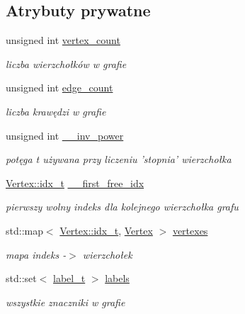 \subsection*{Atrybuty prywatne}
\begin{DoxyCompactItemize}
\item 
unsigned int \hyperlink{classGraph_aa0961f75ec603fa6b4f1e631b70233f1}{vertex\-\_\-count}
\begin{DoxyCompactList}\small\item\em liczba wierzchołków w grafie \end{DoxyCompactList}\item 
unsigned int \hyperlink{classGraph_ad84b4512d3366d236491358b6314bc47}{edge\-\_\-count}
\begin{DoxyCompactList}\small\item\em liczba krawędzi w grafie \end{DoxyCompactList}\item 
unsigned int \hyperlink{classGraph_a53211b7cd85e28093bbe540e5a2ec21d}{\-\_\-\-\_\-inv\-\_\-power}
\begin{DoxyCompactList}\small\item\em potęga t używana przy liczeniu 'stopnia' wierzchołka \end{DoxyCompactList}\item 
\hyperlink{classVertex_a12fe2194264f72b70b284bba723052c1}{Vertex\-::idx\-\_\-t} \hyperlink{classGraph_a205f5526664ea4f94ad94c1cb7de3c56}{\-\_\-\-\_\-first\-\_\-free\-\_\-idx}
\begin{DoxyCompactList}\small\item\em pierwszy wolny indeks dla kolejnego wierzchołka grafu \end{DoxyCompactList}\item 
std\-::map$<$ \hyperlink{classVertex_a12fe2194264f72b70b284bba723052c1}{Vertex\-::idx\-\_\-t}, \hyperlink{classVertex}{Vertex} $>$ \hyperlink{classGraph_a69d5f1746e168b9555daa83b84c0341b}{vertexes}
\begin{DoxyCompactList}\small\item\em mapa indeks -\/$>$ wierzchołek \end{DoxyCompactList}\item 
std\-::set$<$ \hyperlink{classGraph_a2237a0ada8484c37b8200c0e3685ca71}{label\-\_\-t} $>$ \hyperlink{classGraph_a752008a468385625c22da499d248ada3}{labels}
\begin{DoxyCompactList}\small\item\em wszystkie znaczniki w grafie \end{DoxyCompactList}\item 

\end{DoxyCompactItemize}
